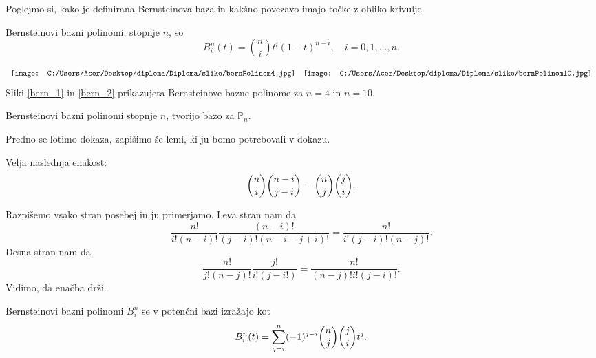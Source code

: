 \documentclass[mat1]{fmfdelo}
\begin{document}
Poglejmo si, kako je definirana Bernsteinova baza in kakšno povezavo imajo točke z obliko krivulje.
\begin{definicija}
Bernsteinovi bazni polinomi, stopnje $n$, so
\begin{equation*}
B_i^n(t) = \binom{n}{i} t^i (1-t)^{n-i}, \quad i=0,1,\dots,n.
\end{equation*}
\end{definicija}
\begin{equation*}
\begin{array}{c c}
\texttt{[image: C:/Users/Acer/Desktop/diploma/Diploma/slike/bernPolinom4.jpg]} &
\texttt{[image: C:/Users/Acer/Desktop/diploma/Diploma/slike/bernPolinom10.jpg]}
\end{array}
\end{equation*}
Sliki \ref{bern_1} in \ref{bern_2} prikazujeta Bernsteinove bazne polinome za $n = 4$ in $n= 10$.
\begin{trditev}
	Bernsteinovi bazni polinomi stopnje $n$, tvorijo bazo za $\mathbb{P}_n$.
\end{trditev}
Predno se lotimo dokaza, zapišimo še lemi, ki ju bomo potrebovali v dokazu.
\begin{lema}
	Velja naslednja enakost:
	\begin{equation}{\label{binom}}
		\binom{n}{i} \binom{n-i}{j-i} = \binom{n}{j} \binom{j}{i}.
	\end{equation}
\end{lema}
\begin{dokaz}
	Razpišemo vsako stran posebej in ju primerjamo. Leva stran nam da
	\begin{equation*}
		\frac{n!}{i!(n-i)!} \frac{(n-i)!}{(j-i)!(n-i-j+i)!} = \frac{n!}{i!(j-i)!(n-j)!}.
	\end{equation*}
	Desna stran nam da
	\begin{equation*}
		\frac{n!}{j!(n-j)!} \frac{j!}{i!(j-i!)} = \frac{n!}{(n-j)!i!(j-i)!}.
	\end{equation*}
	Vidimo, da enačba drži.
\end{dokaz}
\begin{lema}{\label{bern_potencna}}
	Bernsteinovi bazni polinomi $B_i^n$ se v potenčni bazi izražajo kot
	\begin{equation}{\label{bern_pot}}
		B_i^n(t) = \sum_{j=i}^n (-1)^{j-i} \binom{n}{j} \binom{j}{i} t^j.
	\end{equation}
\end{lema}
\end{document}
